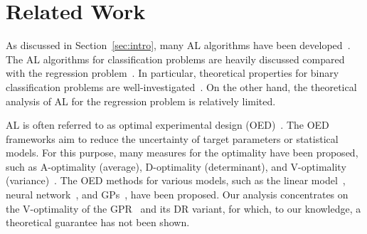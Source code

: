 


\section{Related Work}
\label{sec:related}


As discussed in Section~\ref{sec:intro}, many AL algorithms have been developed~\citep{settles2009-active}.
%
The AL algorithms for classification problems are heavily discussed compared with the regression problem~\citep[for example, ][]{houlsby2011bayesian,zhao2021active,bickford2023-prediction}.
%
In particular, theoretical properties for binary classification problems are well-investigated~\citep{hanneke2014theory}.
%
On the other hand, the theoretical analysis of AL for the regression problem is relatively limited.




AL is often referred to as optimal experimental design (OED)~\citep{lindley1956-on,cohn1993neural,Chaloner1995bayesian,cohn1996active,ryan2007modern}.
%
The OED frameworks aim to reduce the uncertainty of target parameters or statistical models.
%
For this purpose, many measures for the optimality have been proposed, such as A-optimality (average), D-optimality (determinant), and V-optimality (variance)~\citep{pukelsheim2006optimal,zhu2017near}.
%
The OED methods for various models, such as the linear model~\citep[e.g., ][]{zhu2017near}, neural network~\citep[e.g., ][]{cohn1993neural}, and GPs~\citep[e.g., ][]{yu2006active}, have been proposed.
%
Our analysis concentrates on the V-optimality of the GPR~\citep{Seo2000gaussian,yu2006active,Shoham2023experimental} and its DR variant, for which, to our knowledge, a theoretical guarantee has not been shown.



%



